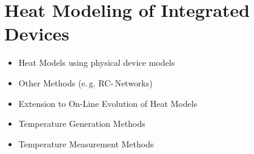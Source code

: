 \chapter{Heat Modeling of Integrated Devices}
\label{ch:heatmodeling}

\begin{itemize}
	\item{Heat Models using physical device models}
\item{Other Methods (e.\,g. RC-\,Networks)}
\item{Extension to On-Line Evolution of Heat Models}
\item{Temperature Generation Methods}
\item{Temperature Measurement Methods}
\end{itemize}